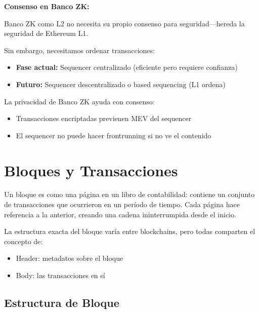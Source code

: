 \documentclass[11pt,a4paper,twoside,openright]{book}
\theoremstyle{definition}
\theoremstyle{plain}
\theoremstyle{remark}
\begin{document}
\begin{bancozk}
\textbf{Consenso en Banco ZK:}

Banco ZK como L2 no necesita su propio consenso para seguridad---hereda la seguridad de Ethereum L1.

Sin embargo, necesitamos ordenar transacciones:
\begin{itemize}
    \item \textbf{Fase actual:} Sequencer centralizado (eficiente pero requiere confianza)
    \item \textbf{Futuro:} Sequencer descentralizado o based sequencing (L1 ordena)
\end{itemize}

La privacidad de Banco ZK ayuda con consenso:
\begin{itemize}
    \item Transacciones encriptadas previenen MEV del sequencer
    \item El sequencer no puede hacer frontrunning si no ve el contenido
\end{itemize}
\end{bancozk}


\section{Bloques y Transacciones}

\begin{intuicion}
Un bloque es como una página en un libro de contabilidad: contiene un conjunto de transacciones que ocurrieron en un período de tiempo. Cada página hace referencia a la anterior, creando una cadena ininterrumpida desde el inicio.

La estructura exacta del bloque varía entre blockchains, pero todas comparten el concepto de:
\begin{itemize}
    \item Header: metadatos sobre el bloque
    \item Body: las transacciones en sí
\end{itemize}
\end{intuicion}

\subsection{Estructura de Bloque}
\end{document}
